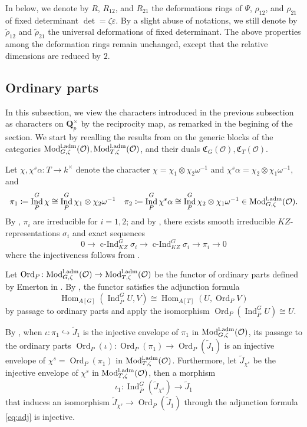 \documentclass[leqno]{amsart}
\newcommand{\laMod}{\textnormal{Mod}^{\textnormal{l.adm}}}
\newcommand{\fC}{\mathfrak C}
\DeclareMathOperator{\Ord}{Ord}
\newcommand{\Qp}{\mathbf{Q}_p}
\newcommand{\oo}{\mathcal{O}} %
\DeclareMathOperator{\Hom}{Hom}
\DeclareMathOperator{\Ind}{Ind}
\DeclareMathOperator{\cInd}{c-Ind}
\theoremstyle{definition}
\theoremstyle{remark}
\begin{document}
In below, we denote by 
$R$,  $R_{12}$, and $R_{21}$
the deformations rings of 
$\Psi$,  $\rho_{12}$, and $\rho_{21}$
of fixed determinant $\det=\zeta\varepsilon$.
By a slight abuse of notations,
we still denote by $\tilde{\rho}_{12}$
and $\tilde{\rho}_{21}$ the universal deformations
of fixed determinant.
The above properties among the deformation rings
remain unchanged,
except that the relative dimensions are reduced by $2$.

\subsection{Ordinary parts}

In this subsection,
we view the characters introduced 
in the previous subsection as characters
on $\Qp^\times$ by the reciprocity map,
as remarked in the begining of the section.
We start by recalling the results from
\cite[\S 7 \S 8]{pask}
on the generic blocks of the categories
$\laMod_{G,\zeta}(\oo), \laMod_{T,\zeta}(\oo)$,
and their duals $\fC_G(\oo), \fC_T(\oo)$.

Let $\chi, \chi^s\alpha\colon T\to k^\times$
denote the character  
$\chi=\chi_1\otimes\chi_2\omega^{-1}$
and  $\chi^s\alpha=\chi_2\otimes \chi_1\omega^{-1}$, and
\[
\pi_1\coloneqq \Ind_{P}^G\chi\cong
\Ind_{P}^G\chi_1\otimes\chi_2\omega^{-1}\quad
\pi_2\coloneqq \Ind_{P}^G\chi^s\alpha\cong 
\Ind_{P}^G\chi_2\otimes\chi_1\omega^{-1} \in \laMod_{G,\zeta}(\oo).
\]
By \cite[Thm 30]{barthel},
$\pi_i$ are irreducible for  $i=1,2$;
and by \cite[Thm 33]{barthel}, there exists
smooth irreducible $KZ$-representations $\sigma_i$
and exact sequences
\begin{equation}
	0\to \cInd_{KZ}^G\sigma_i\to
	\cInd_{KZ}^G\sigma_i\to \pi_i\to 0
\end{equation}
where the injectiveness follows from \cite[Thm 19]{barthel}.


Let
$\Ord_P\colon \laMod_{G,\zeta}(\oo)\to \laMod_{T,\zeta}(\oo)$
be the functor of ordinary parts
defined by Emerton in \cite{emeI}.
By \cite[Thm 4.4.6]{emeI},
the functor satisfies the adjunction formula
\begin{equation}\label{eq:adj}
	\Hom_{A[G]}(\Ind_{\bar{P}}^GU,V)\cong
	\Hom_{A[T]}(U,\Ord_PV)
\end{equation}
by passage to ordinary parts and apply the isomorphism 
$\Ord_P(\Ind_{\bar{P}}^GU)\cong U$.

By \cite[Prop 7.1]{pask},
when $\iota\colon \pi_1\hookrightarrow \tilde{J}_1$
is the injective envelope of $\pi_1$
in $\laMod_{G,\zeta}(\oo)$,
its passage to the ordinary parts
$\Ord_P(\iota)\colon \Ord_P(\pi_1)\to \Ord_P(\tilde{J}_1)$
is an injective envelope of $\chi^s=\Ord_P(\pi_1)$
in $\laMod_{T,\zeta}(\oo)$.
Furthermore, 
let $\tilde{J}_{\chi^s}$
be the injective envelope of $\chi^s$
in $\laMod_{T,\zeta}(\oo)$,
then a morphism
\begin{equation}\label{eq:inj_envelope}
	\iota_1\colon \Ind_{\bar{P}}^G(\tilde{J}_{\chi^s})\to \tilde{J}_1
\end{equation}
that induces an isomorphism 
$\tilde{J}_{\chi^s}\to \Ord_P(\tilde{J}_1)$
through the adjunction formula \eqref{eq:adj}
is injective.
\end{document}
